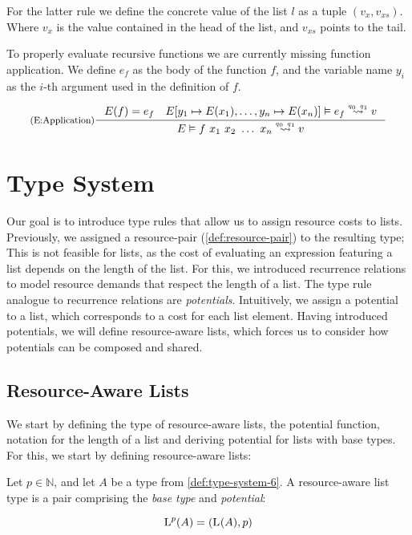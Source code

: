 For the latter rule we define the concrete value of the list \(l\) as a tuple \((v_x, v_{xs})\). Where \(v_x\) is the value contained in the head of the list, and \(v_{xs}\) points to the tail. 

To properly evaluate recursive functions we are currently missing function application. We define \(e_f\) as the body of the function \(f\), and the variable name \(y_i\) as the \(i\)-th argument used in the definition of \(f\). 

\[
   \inference[(E:Application)]
   {E(f) = e_f 
   \quad 
   \evals{E[y_1 \mapsto E(x_1), \dots, y_n \mapsto E(x_n)]}{e_f}{v}{q_0}{q_1}}
   {\evals{E}{f~x_1~x_2~\dots~x_n}{v}{q_0}{q_1}}
\]

\section{Type System}

Our goal is to introduce type rules that allow us to assign resource costs to lists. Previously, we assigned a resource-pair (\cref{def:resource-pair}) to the resulting type; This is not feasible for lists, as the cost of evaluating an expression featuring a list depends on the length of the list. For this, we introduced recurrence relations to model resource demands that respect the length of a list. The type rule analogue to recurrence relations are \emph{potentials}. Intuitively, we assign a potential to a list, which corresponds to a cost for each list element. Having introduced potentials, we will define resource-aware lists, which forces us to consider how potentials can be composed and shared.

\subsection{Resource-Aware Lists}\label{sec:resource-aware-lists}

We start by defining the type of resource-aware lists, the potential function, notation for the length of a list and deriving potential for lists with base types. For this, we start by defining resource-aware lists:

\begin{definition}\label{def:ra-list}
   Let \(p \in \mathbb{N}\), and let \(A\) be a type from \cref{def:type-system-6}. A resource-aware list type is a pair comprising the \emph{base type} and \emph{potential}:

   \[
      \text{L}^{p}(A) = (\text{L}^{}(A), p)
   \]
\end{definition}

